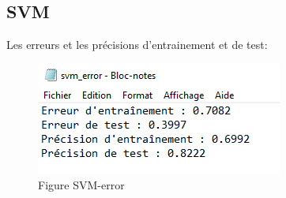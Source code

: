 \subsection{SVM}
\par Les erreurs et les précisions d'entrainement et de test:
\begin{figure}[H]
    \centering
    \includegraphics{svm.png}
    \caption{Figure SVM-error }
    \label{Figure fichier svm-error }
\end{figure}
